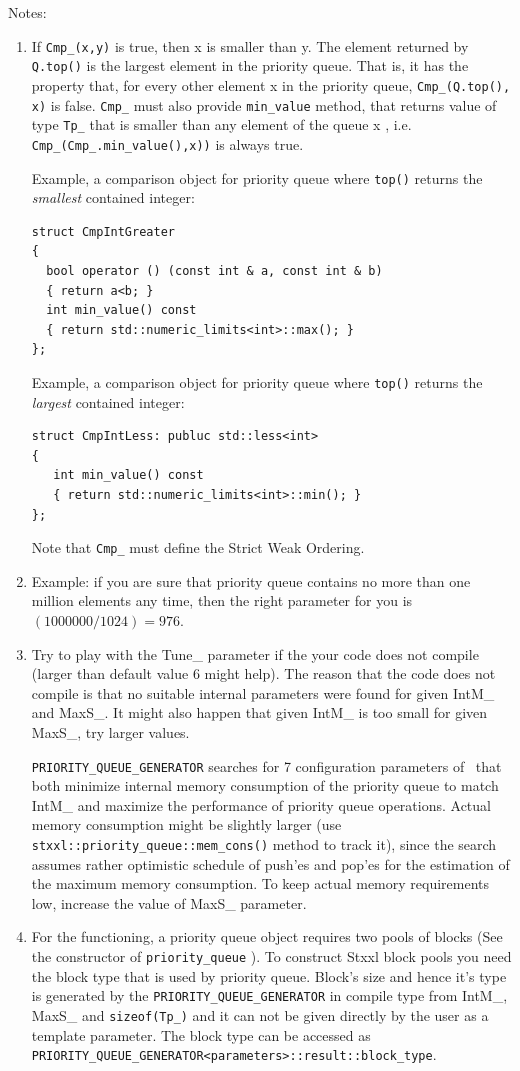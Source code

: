 \documentclass[twoside]{book}
\newcommand{\stxxl}{{\sc Stxxl} }
\begin{document}
Notes:
\begin{enumerate}
\item If \texttt{Cmp\_(x,y)} is true, then x is smaller than y. The element
returned by \texttt{Q.top()} is the largest element in the priority queue. That
is, it has the property that, for every other element x in the
priority queue, \texttt{Cmp\_(Q.top(), x)} is false. \texttt{Cmp\_}
must also provide 
\texttt{min\_value} method, that returns value of type \texttt{Tp\_}
that is smaller than 
any element of the queue x , i.e. \texttt{Cmp\_(Cmp\_.min\_value(),x))}
is always true. 

Example, a comparison object for priority queue where \texttt{top()}
returns the \emph{smallest} contained integer: 
\begin{lstlisting}
struct CmpIntGreater
{
  bool operator () (const int & a, const int & b)
  { return a<b; }
  int min_value() const  
  { return std::numeric_limits<int>::max(); }
};
\end{lstlisting}
Example, a comparison object for priority queue where \texttt{top()}
returns the \emph{largest} contained integer: 
\begin{lstlisting}
struct CmpIntLess: publuc std::less<int>
{
   int min_value() const  
   { return std::numeric_limits<int>::min(); }
};
\end{lstlisting}
Note that \texttt{Cmp\_} must define the Strict Weak Ordering.

\item Example: if you are sure that priority queue contains no more
than one million elements any time, then the right parameter for you is
$(1000000/1024)= 976$.

\item Try to play with the Tune\_ parameter if the your code does not
compile (larger than default value 6 might help). The reason that the
code does not 
compile is that no suitable 
internal parameters were found for given IntM\_ and MaxS\_. It might
also happen that given IntM\_ is too small for given MaxS\_, try larger
values.
 
\texttt{PRIORITY\_QUEUE\_GENERATOR} searches for 7 
configuration parameters of \xpqueue\ that both minimize
internal memory consumption of the priority queue to match IntM\_ and
maximize the performance of priority queue operations. Actual memory
consumption might be slightly larger (use
\texttt{stxxl::priority\_queue::mem\_cons()}
method to track it), since the search assumes rather optimistic
schedule of push'es and pop'es for the estimation of the maximum
memory consumption. To keep actual memory requirements low, increase
the value of MaxS\_ parameter. 
\item 
For the functioning, a priority queue object requires two pools of blocks
(See the constructor of \texttt{priority\_queue} ). To construct
\stxxl block pools 
you need the block type that is used by priority queue. Block's size
and hence it's type is generated by the 
\texttt{PRIORITY\_QUEUE\_GENERATOR} in compile type from IntM\_, MaxS\_
and \texttt{sizeof(Tp\_)} and it can not be given directly by the user
as a template parameter. The block type can be accessed as\\
\texttt{PRIORITY\_QUEUE\_GENERATOR<parameters>::result::block\_type}. 


\end{enumerate}
\end{document}
